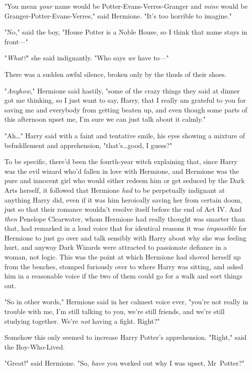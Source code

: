 "You mean \emph{your} name would be Potter-Evans-Verres-Granger and \emph{mine}
would be Granger-Potter-Evans-Verres," said Hermione. "It's too horrible to
imagine."

"No," said the boy, "House Potter is a Noble House, so I think that name stays
in front—"

"\emph{What?}" she said indignantly. "Who says \emph{we} have to—"

There was a sudden awful silence, broken only by the thuds of their shoes.

"\emph{Anyhow,}" Hermione said hastily, "some of the crazy things they said at
dinner got me thinking, so I just want to say, Harry, that I really am grateful
to you for saving me and everybody from getting beaten up, and even though some
parts of this afternoon upset me, I'm sure we can just talk about it calmly."

"Ah…" Harry said with a faint and tentative smile, his eyes showing a
mixture of befuddlement and apprehension, "that's…good, I guess?"

To be specific, there'd been the fourth-year witch explaining that, since Harry
was the evil wizard who'd fallen in love with Hermione, and Hermione was the
pure and innocent girl who would either redeem him or get seduced by the Dark
Arts herself, it followed that Hermione \emph{had} to be perpetually indignant
at anything Harry did, even if it was him heroically saving her from certain
doom, just so that their romance wouldn't resolve itself before the end of Act
IV. And \emph{then} Penelope Clearwater, whom Hermione had really thought was
smarter than that, had remarked in a loud voice that for identical reasons it
was \emph{impossible} for Hermione to just go over and talk sensibly with Harry
about why she was feeling hurt, and anyway Dark Wizards were attracted to
passionate defiance in a woman, not logic. This was the point at which Hermione
had shoved herself up from the benches, stomped furiously over to where Harry
was sitting, and asked him in a reasonable voice if the two of them could go
for a walk and sort things out.

"So in other words," Hermione said in her calmest voice ever, "you're not
really in trouble with me, I'm still talking to you, we're still friends, and
we're still studying together. We're \emph{not} having a fight. Right?"

Somehow this only seemed to increase Harry Potter's apprehension. "Right," said
the Boy-Who-Lived.

"Great!" said Hermione. "So, \emph{have} you worked out why I was upset,
Mr~Potter?"

